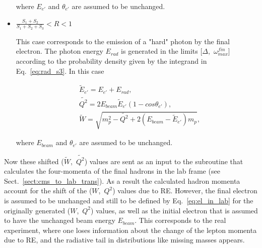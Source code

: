 \begin{itemize}
where $E_{e'}$ and $\theta_{e'}$ are assumed to be unchanged.

\item $\frac{S_1+S_2}{S_1+S_2+S_3} < R < 1$

This case corresponds to the emission of a "hard" photon by the final electron. The photon energy $E_{rad}$ is generated in the limits [$\Delta$,~$\omega_{max}^{fin}$] according to the probability density given by the integrand in Eq.~\eqref{eq:rad_s3}. In this case

\begin{equation}
\begin{aligned}
& \widetilde{E}_{e'} = E_{e'} + E_{rad},\\
& \widetilde{Q^2} = 2E_{beam}\widetilde{E}_{e'}(1 - cos\theta_{e'}),\\
& \widetilde{W} = \sqrt{m_{p}^{2} - \widetilde{Q^2} + 2(E_{beam} - \widetilde{E}_{e'})m_{p}},
\label{eq:3rd_case}
\end{aligned}
\end{equation}

where $E_{beam}$ and $\theta_{e'}$ are assumed to be unchanged.

\end{itemize}


Now these shifted ($\widetilde{W}$,~$\widetilde{Q^2}$) values are sent as an input to the subroutine that calculates the four-momenta of the final hadrons in the lab frame (see Sect.~\ref{sect:cms_to_lab_trans}). As a result the calculated hadron momenta account for the shift of the ($W$,~$Q^2$) values due to RE. However, the final electron is assumed to be unchanged and still to be defined by Eq.~\eqref{eq:el_in_lab} for the originally generated ($W$,~$Q^2$) values, as well as the initial electron that is assumed to have the unchanged beam energy $E_{beam}$. This corresponds to the real experiment, where one loses information about the change of the lepton momenta due to RE, and the radiative tail in distributions like missing masses appears.

